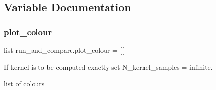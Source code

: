 \subsection{Variable Documentation}
\mbox{\label{namespacerun__and__compare_a86c0405082db018bcbc839ed5278319f}} 
\subsubsection{\texorpdfstring{plot\+\_\+colour}{plot\_colour}}
{\footnotesize\ttfamily list run\+\_\+and\+\_\+compare.\+plot\+\_\+colour = \mbox{[}$\,$\mbox{]}}



If kernel is to be computed exactly set N\+\_\+kernel\+\_\+samples = \textquotesingle{}infinite\textquotesingle{}. 

list of colours 